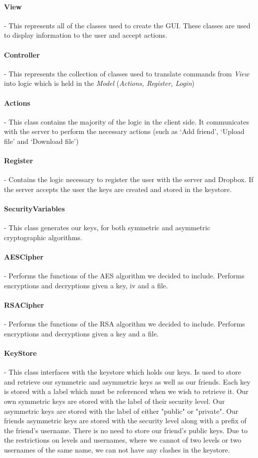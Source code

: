 \documentclass[12pt, titlepage]{article}
\begin{document}
\paragraph*{View} - This represents all of the classes used to create the GUI. These classes are used to display information to the user and accept actions.
\paragraph*{Controller} - This represents the collection of classes used to translate commands from \textit{View} into logic which is held in the \textit{Model} (\textit{Actions, Register, Login})
\paragraph*{Actions} - This class contains the majority of the logic in the client side. It communicates with the server to perform the necessary actions (such as `Add friend', `Upload file' and `Download file')
\paragraph*{Register} - Contains the logic necessary to register the user with the server and Dropbox. If the server accepts the user the keys are created and stored in the keystore.
\paragraph*{SecurityVariables} - This class generates our keys, for both symmetric and asymmetric cryptographic algorithms.
\paragraph*{AESCipher} - Performs the functions of the AES algorithm we decided to include. Performs encryptions and decryptions given a key, iv and a file.
\paragraph*{RSACipher} - Performs the functions of the RSA algorithm we decided to include. Performs encryptions and decryptions given a key and a file.
\paragraph*{KeyStore} - This class interfaces with the keystore which holds our keys. Is used to store and retrieve our symmetric and asymmetric keys as well as our friends. Each key is stored with a label which must be referenced when we wish to retrieve it. Our own symmetric keys are stored with the label of their security level. Our asymmetric keys are stored with the label of either "public" or "private". Our friends asymmetric keys are stored with the security level along with a prefix of the friend's username. There is no need to store our friend's public keys. Due to the restrictions on levels and usernames, where we cannot of two levels or two usernames of the same name, we can not have any clashes in the keystore.
\end{document}
